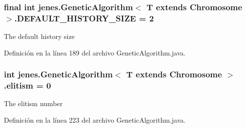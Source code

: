 \hypertarget{classjenes_1_1_genetic_algorithm_3_01_t_01extends_01_chromosome_01_4_a23df2e338c3439d7457ff6a150c573e1}{
\subsubsection[{D\-E\-F\-A\-U\-L\-T\-\_\-\-H\-I\-S\-T\-O\-R\-Y\-\_\-\-S\-I\-Z\-E}]{\setlength{\rightskip}{0pt plus 5cm}final int jenes.\-Genetic\-Algorithm$<$ T extends Chromosome $>$.D\-E\-F\-A\-U\-L\-T\-\_\-\-H\-I\-S\-T\-O\-R\-Y\-\_\-\-S\-I\-Z\-E = 2\hspace{0.3cm}{\ttfamily [static]}}}\label{classjenes_1_1_genetic_algorithm_3_01_t_01extends_01_chromosome_01_4_a23df2e338c3439d7457ff6a150c573e1}
The default history size 

Definición en la línea 189 del archivo Genetic\-Algorithm.\-java.

\hypertarget{classjenes_1_1_genetic_algorithm_3_01_t_01extends_01_chromosome_01_4_ac4280b01e7da0ddc049050b19e28b8b9}{
\subsubsection[{elitism}]{\setlength{\rightskip}{0pt plus 5cm}int jenes.\-Genetic\-Algorithm$<$ T extends Chromosome $>$.elitism = 0\hspace{0.3cm}{\ttfamily [protected]}}}\label{classjenes_1_1_genetic_algorithm_3_01_t_01extends_01_chromosome_01_4_ac4280b01e7da0ddc049050b19e28b8b9}
The elitism number 

Definición en la línea 223 del archivo Genetic\-Algorithm.\-java.

